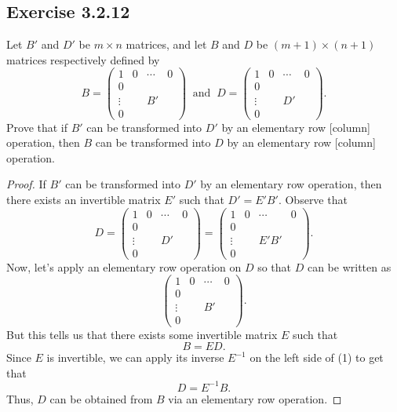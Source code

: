 \subsection*{Exercise 3.2.12} Let \( B'  \) and \( D'  \) be \( m \times n  \) matrices, and let \( B  \) and \( D  \) be \( (m + 1) \times (n+1) \) matrices respectively defined by 
\[  B = \begin{pmatrix} 
        1 & 0 & \cdots & 0  \\
        0  &  \\
        \vdots & & B' &   \\
        0 &    &
    \end{pmatrix} \ \text{ and } \ D = \begin{pmatrix} 
        1 & 0 & \cdots & 0  \\
        0  &  \\
        \vdots & & D' &   \\
        0 &    &
              \end{pmatrix}.   \]
              Prove that if \( B'  \) can be transformed into \( D'  \) by an elementary row [column] operation, then \( B  \) can be transformed into \( D  \) by an elementary row [column] operation.
\begin{proof}
    If \( B'  \) can be transformed into \( D'  \) by an elementary row operation, then there exists an invertible matrix \( E'  \) such that \( D' = E'B'  \). Observe that
    \[ D = \begin{pmatrix} 
        1 & 0 & \cdots & 0  \\
        0  &  \\
        \vdots & & D' &   \\
        0 &    &
    \end{pmatrix} =  \begin{pmatrix}
        1 & 0 & \cdots & 0  \\
        0  &  \\
        \vdots & & E'B' &   \\
        0 &    &
    \end{pmatrix}.
\]
Now, let's apply an elementary row operation on \( D  \) so that \( D  \) can be written as 
\[  \begin{pmatrix} 
        1 & 0 & \cdots & 0  \\
        0  &  \\
        \vdots & & B' &   \\
        0 &    &
          \end{pmatrix}.  \]
          But this tells us that there exists some invertible matrix \( E  \) such that \[ B = ED.   \tag{1}\] Since \( E  \) is invertible, we can apply its inverse \( E^{-1} \) on the left side of (1) to get that
          \[  D = E^{-1} B. \]
          Thus, \( D  \) can be obtained from \( B  \) via an elementary row operation.
\end{proof}


